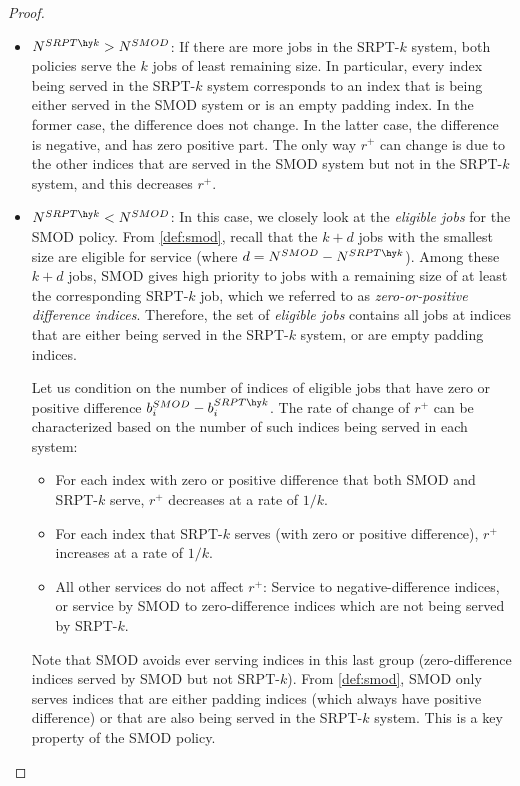 \documentclass[acmsmall]{acmart}
\begin{document}
\begin{proof}
\begin{itemize}
        \item $N^{SRPT\hy k}>N^{SMOD}$: If there are more jobs in the SRPT-$k$ system, both policies serve the $k$ jobs of least remaining size. In particular, every index being served in the SRPT-$k$ system corresponds to an index that is being either served in the SMOD system or is an empty padding index. In the former case, the difference does not change. In the latter case, the difference is negative, and has zero positive part. The only way $r^+$ can change is due to the other indices that are served in the SMOD system but not in the SRPT-$k$ system, and this decreases $r^+$.

        \item $N^{SRPT\hy k}<N^{SMOD}$: In this case, we closely look at the \textit{eligible jobs} for the SMOD policy. From \cref{def:smod}, recall that the $k+d$ jobs with the smallest size are eligible for service (where $d=N^{SMOD}-N^{SRPT\hy k}$). Among these $k+d$ jobs, SMOD gives high priority to jobs with a remaining size of at least the corresponding SRPT-$k$ job, which we referred to as \textit{zero-or-positive difference indices}. Therefore, the set of \textit{eligible jobs} contains all jobs at indices that are either being served in the SRPT-$k$ system, or are empty padding indices.
        
        Let us condition on the number of indices of eligible jobs that have zero or positive difference $b_i^{SMOD} - b_i^{SRPT\hy k}$. The rate of change of $r^+$ can be characterized based on the number of such indices being served in each system:
        \begin{itemize}
            \item For each index with zero or positive difference that both SMOD and SRPT-$k$ serve, $r^+$ decreases at a rate of $1/k$. 
            \item For each index that SRPT-$k$ serves (with zero or positive difference), $r^+$ increases at a rate of $1/k$. 
            \item All other services do not affect $r^+$: Service to negative-difference indices, or service by SMOD to zero-difference indices which are not being served by SRPT-$k$.
        \end{itemize}

        Note that SMOD avoids ever serving indices in this last group (zero-difference indices served by SMOD but not SRPT-$k$). From \cref{def:smod}, SMOD only serves indices that are either padding indices (which always have positive difference) or that are also being served in the SRPT-$k$ system. This is a key property of the SMOD policy.
        

\end{itemize}
\end{proof}
\end{document}
